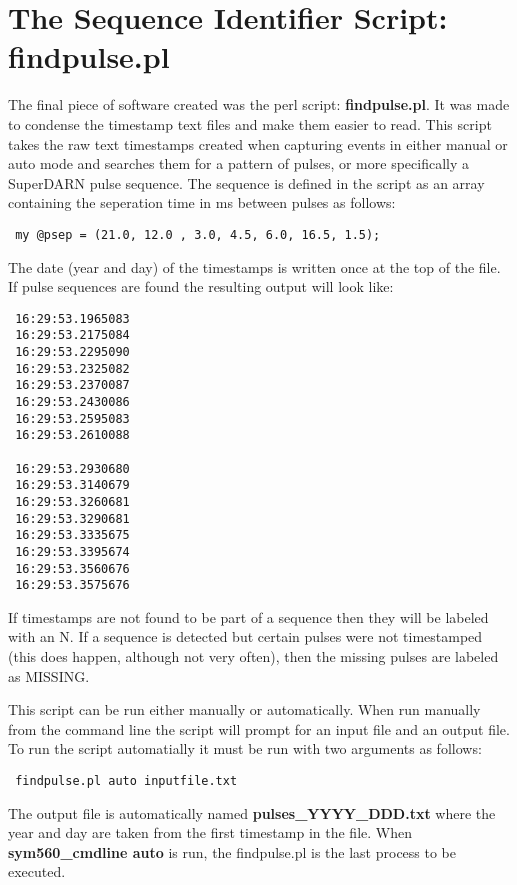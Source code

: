 \documentclass[11pt]{article}
\begin{document}




    \section{The Sequence Identifier Script: findpulse.pl} \label{seqscript}

    The final piece of software created was the perl script: \textbf{findpulse.pl}. It was made to condense the timestamp text files and make them easier to read. This script takes the raw text timestamps created when capturing events in either manual or auto mode and searches them for a pattern of pulses, or more specifically a SuperDARN pulse sequence. The sequence is defined in the script as an array containing the seperation time in ms between pulses as follows:
    \begin{verbatim}
 my @psep = (21.0, 12.0 , 3.0, 4.5, 6.0, 16.5, 1.5);
    \end{verbatim}
    The date (year and day) of the timestamps is written once at the top of the file.
    If pulse sequences are found the resulting output will look like:
    \begin{verbatim}
 16:29:53.1965083
 16:29:53.2175084
 16:29:53.2295090
 16:29:53.2325082
 16:29:53.2370087
 16:29:53.2430086
 16:29:53.2595083
 16:29:53.2610088

 16:29:53.2930680
 16:29:53.3140679
 16:29:53.3260681
 16:29:53.3290681
 16:29:53.3335675
 16:29:53.3395674
 16:29:53.3560676
 16:29:53.3575676
    \end{verbatim}
    If timestamps are not found to be part of a sequence then they will be labeled with an N. If a sequence is detected but certain pulses were not timestamped (this does happen, although not very often), then the missing pulses are labeled as MISSING.

    This script can be run either manually or automatically. When run manually from the command line the script will prompt for an input file and an output file. To run the script automatially it must be run with two arguments as follows:
    \begin{verbatim}
 findpulse.pl auto inputfile.txt
    \end{verbatim}
    The output file is automatically named \textbf{pulses\_YYYY\_DDD.txt} where the year and day are taken from the first timestamp in the file. When \textbf{sym560\_cmdline auto} is run, the findpulse.pl is the last process to be executed.
\end{document}
